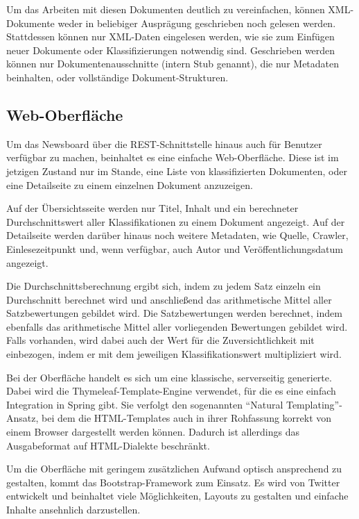 Um das Arbeiten mit diesen Dokumenten deutlich zu vereinfachen, können XML-Dokumente
weder in beliebiger Ausprägung geschrieben noch gelesen werden. Stattdessen können
nur XML-Daten eingelesen werden, wie sie zum Einfügen neuer Dokumente
oder Klassifizierungen notwendig sind.
Geschrieben werden können nur Dokumentenausschnitte (intern Stub genannt),
die nur Metadaten beinhalten, oder vollständige Dokument-Strukturen.

\subsection{Web-Oberfläche}
Um das Newsboard über die REST-Schnittstelle hinaus auch für Benutzer verfügbar zu machen,
beinhaltet es eine einfache Web-Oberfläche.
Diese ist im jetzigen Zustand nur im Stande, eine Liste von klassifizierten Dokumenten,
oder eine Detailseite zu einem einzelnen Dokument anzuzeigen.

Auf der Übersichtsseite werden nur Titel, Inhalt und ein berechneter Durchschnittswert
aller Klassifikationen zu einem Dokument angezeigt. Auf der Detailseite werden
darüber hinaus noch weitere Metadaten, wie Quelle, Crawler, Einlesezeitpunkt
und, wenn verfügbar, auch Autor und Veröffentlichungsdatum angezeigt.

Die Durchschnittsberechnung ergibt sich, indem zu jedem Satz einzeln ein Durchschnitt
berechnet wird und anschließend das arithmetische Mittel aller Satzbewertungen
gebildet wird. Die Satzbewertungen werden berechnet, indem ebenfalls das arithmetische
Mittel aller vorliegenden Bewertungen gebildet wird. Falls vorhanden, wird dabei auch der
Wert für die Zuversichtlichkeit mit einbezogen, indem er mit dem jeweiligen
Klassifikationswert multipliziert wird.

Bei der Oberfläche handelt es sich um eine klassische, serverseitig generierte.
Dabei wird die Thymeleaf-Template-Engine verwendet, für die es eine einfach Integration in
Spring gibt. Sie verfolgt den sogenannten "`Natural Templating"'-Ansatz,
bei dem die HTML-Templates auch in ihrer Rohfassung korrekt von einem Browser
dargestellt werden können. Dadurch ist allerdings das Ausgabeformat
auf HTML-Dialekte beschränkt.

Um die Oberfläche mit geringem zusätzlichen Aufwand optisch ansprechend zu gestalten,
kommt das Bootstrap-Framework zum Einsatz. Es wird von Twitter entwickelt und
beinhaltet viele Möglichkeiten, Layouts zu gestalten und einfache Inhalte
ansehnlich darzustellen\cite{bootstrap}.

